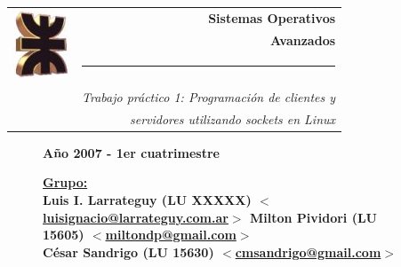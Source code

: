 \thispagestyle{empty}

\begin{center}
\begin{tabular}{cr}
\multirow{4}{*}{ \includegraphics{logoUTN.jpg} }
& \Huge\bfseries Sistemas Operativos \\
& \Huge\bfseries Avanzados \\
& \noindent\rule[-1ex]{120mm}{4pt} \\
& \\
& \noindent\large\emph{Trabajo práctico 1: Programación de clientes y} \\
& \noindent\large\emph{servidores utilizando sockets en Linux}
\end{tabular}
\end{center}


\begin{figure}[b]
\center\large\textbf{Año 2007 - 1er cuatrimestre}
\normalsize
\linebreak
\begin{flushleft}
\bfseries
\underline{Grupo:}\\
Luis I. Larrateguy (\textnormal{LU} XXXXX) \href{mailto:luisignacio@larrateguy.com.ar}
  {$<$luisignacio@larrateguy.com.ar$>$}
Milton Pividori (\textnormal{LU} 15605) \href{mailto:miltondp@gmail.com}
  {$<$miltondp@gmail.com$>$}\\
César Sandrigo (\textnormal{LU} 15630) \href{mailto:cmsandrigo@gmail.com}
  {$<$cmsandrigo@gmail.com$>$}
\end{flushleft}

\end{figure}
